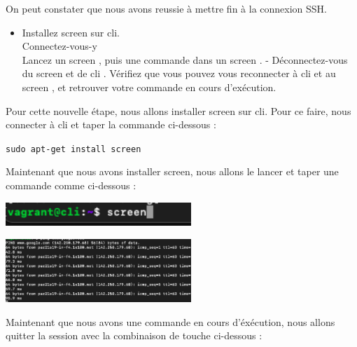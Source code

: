 \documentclass[12pt]{article}
\begin{document}
\vspace{0.3cm}

On peut constater que nous avons reussie à mettre fin à la connexion SSH.

\vspace{0.3cm}

\begin{itemize}
  \item Installez screen sur cli. \\
  Connectez-vous-y \\
  Lancez un screen , puis une commande dans un screen . - Déconnectez-vous
  du screen et de cli . Vérifiez que vous pouvez vous reconnecter à cli et au
  screen , et retrouver votre commande en cours d’exécution.
\end{itemize}

\vspace{0.3cm}

Pour cette nouvelle étape, nous allons installer screen sur cli. Pour ce faire, nous connecter à cli et taper la commande ci-dessous : 

\texttt{sudo apt-get install screen}

\vspace{0.3cm}

Maintenant que nous avons installer screen, nous allons le lancer et taper une commande comme ci-dessous  : 

\vspace{0.3cm}

\begin{center}
  \includegraphics[width=7cm]{Image-TD-SSH-9/screen.png}
\end{center}

\vspace{0.3cm}

\begin{center}
  \includegraphics[width=7cm]{Image-TD-SSH-9/ping.png}
\end{center}

\vspace{0.3cm}

Maintenant que nous avons une commande en cours d'éxécution, nous allons quitter la session avec la combinaison de touche ci-dessous : 
\end{document}
